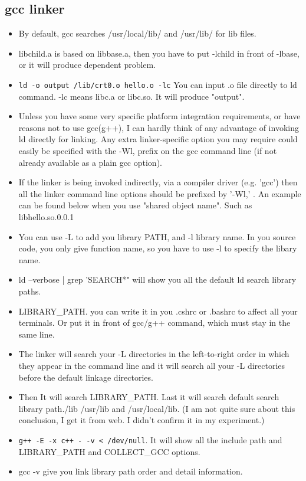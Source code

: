 \documentclass[a4paper,12pt,twoside]{book}
\begin{document}
\subsection{gcc linker}
			 \begin{itemize}
			 \item By default, gcc searches /usr/local/lib/ and /usr/lib/ for lib files.
			 
			 \item libchild.a is based on libbase.a, then you have to put -lchild in front of -lbase, or it will produce dependent problem. 
			 
			\item \verb=ld -o output /lib/crt0.o hello.o -lc= You can input .o file directly to ld command. -lc means libc.a or libc.so. It will produce "output". 
					 
			\item Unless you have some very specific platform integration requirements, or have reasons not to use gcc(g++), I can hardly think of any advantage of invoking ld directly for linking. Any extra linker-specific option you may require could easily be specified with the -Wl, prefix on the gcc command line (if not already available as a plain gcc option).

			 \item If the linker is being invoked indirectly, via a compiler driver (e.g. 'gcc') then all the linker command line options should be prefixed by '-Wl,' . An example can be found below when you use "shared object name". Such as libhello.so.0.0.1

    \item You can use -L to add you library PATH, and -l library name. In you source code, you only give function name, so you have to use -l to specify the libary name. 

	\item ld --verbose | grep 'SEARCH*" will show you all the default ld search library paths.
			
   \item LIBRARY\_PATH. you can write it in you .cshrc or .bashrc to affect all your terminals. Or put it in front of gcc/g++ command, which must stay in the same line.        
	 
	\item The linker will search your -L directories in the left-to-right order in which they appear in the command line and it will search all your -L directories before the default linkage directories.
	
	\item Then It will search LIBRARY\_PATH. Last it will search default search library path./lib /usr/lib and /usr/local/lib. (I am not quite sure about this conclusion, I get it from web. I didn't confirm it in my experiment.)
	
	\item \verb=g++ -E -x c++ - -v < /dev/null=. It will show all the include path and LIBRARY\_PATH and COLLECT\_GCC options.

	\item gcc -v give you link library path order and detail information. 
	\end{itemize}
\end{document}
